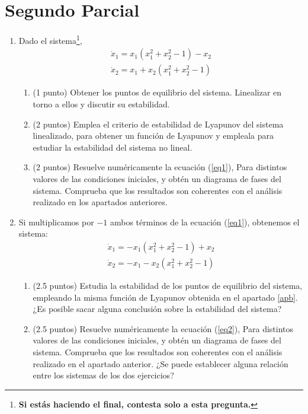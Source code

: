 \documentclass[10pt,a4paper]{article}
\begin{document}
\section{Segundo Parcial}
\begin{enumerate}
\item Dado el sistema\footnote{\textbf{Si estás haciendo el final, contesta solo a esta pregunta.}},
\begin{equation}\label{eq1}
\begin{split}
\dot x_1 = x_1(x_1^2 + x_2^2 -1) -x_2\\
\dot x_2 = x_1 + x_2(x_1^2+x_2^2-1)
\end{split}
\end{equation}
\begin{enumerate}
\item (1 punto) Obtener los puntos de equilibrio del sistema. Linealizar en torno a ellos y discutir su estabilidad.
\item \label{apb} (2 puntos)  Emplea el criterio de estabilidad de Lyapunov del sistema linealizado, para obtener un función de Lyapunov y empleala para  estudiar la estabilidad del sistema no lineal.

\item (2 puntos) Resuelve numéricamente la ecuación (\ref{eq1}), Para distintos valores de las condiciones iniciales, y obtén un diagrama de fases del sistema. Comprueba que los resultados son coherentes con el análisis realizado en los apartados anteriores.
\end{enumerate}
\item Si multiplicamos por $-1$ ambos términos de la ecuación (\ref{eq1}), obtenemos el sistema:
\begin{equation}\label{eq2}
\begin{split}
\dot x_1 = -x_1(x_1^2 + x_2^2 -1) + x_2\\
\dot x_2 = -x_1 - x_2(x_1^2+x_2^2-1)
\end{split}
\end{equation}
\begin{enumerate}
\item (2.5 puntos) Estudia la estabilidad de los puntos de equilibrio del sistema, empleando la misma función de Lyapunov obtenida en el apartado \ref{apb}. ¿Es posible sacar alguna conclusión sobre la estabilidad del sistema?
\item (2.5 puntos) Resuelve numéricamente la ecuación (\ref{eq2}), Para distintos valores de las condiciones iniciales, y obtén un diagrama de fases del sistema. Comprueba que los resultados son coherentes con el análisis realizado en el apartado anterior. ¿Se puede establecer alguna relación entre los sistemas de los dos ejercicios?
\end{enumerate}
\end{enumerate}
\end{document}
